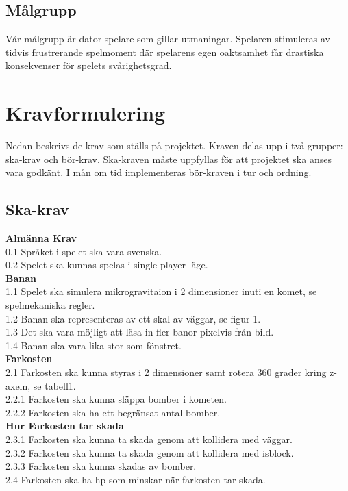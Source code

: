 \documentclass{TDP005mall}
\begin{document}
\subsection{Målgrupp}
Vår målgrupp är dator spelare som gillar utmaningar. Spelaren stimuleras av
tidvis frustrerande spelmoment där spelarens egen oaktsamhet får drastiska
konsekvenser för spelets svårighetsgrad. 
\pagebreak

\section{Kravformulering}
Nedan beskrivs de krav som ställs på projektet. Kraven delas upp i två grupper:
ska-krav och bör-krav. Ska-kraven måste uppfyllas för att projektet ska anses
vara godkänt. I mån om tid implementeras bör-kraven i tur och ordning.

\subsection{Ska-krav}

\textbf{Almänna Krav}\\
0.1 Språket i spelet ska vara svenska. \\
0.2 Spelet ska kunnas spelas i single player läge. \\

\textbf{Banan}\\
1.1 Spelet ska simulera mikrogravitaion i 2 dimensioner inuti en komet, se
spelmekaniska regler. \\
1.2 Banan ska representeras av ett skal av väggar, se figur 1. \\
1.3 Det ska vara möjligt att läsa in fler banor pixelvis från bild. \\
1.4 Banan ska vara lika stor som fönstret.\\

\textbf{Farkosten}\\
2.1 Farkosten ska kunna styras i 2 dimensioner samt rotera 360 grader kring 
z-axeln, se tabell1. \\
2.2.1 Farkosten ska kunna släppa bomber i kometen. \\
2.2.2 Farkosten ska ha ett begränsat antal bomber. \\
\textbf{Hur Farkosten tar skada} \\
2.3.1 Farkosten ska kunna ta skada genom att kollidera med väggar. \\
2.3.2 Farkosten ska kunna ta skada genom att kollidera med isblock. \\
2.3.3 Farkosten ska kunna skadas av bomber. \\
2.4 Farkosten ska ha hp som minskar när farkosten tar skada. \\
\end{document}
